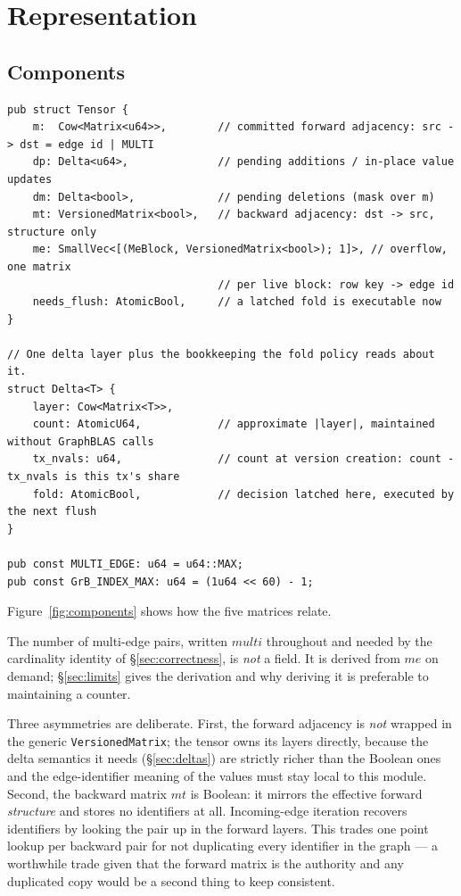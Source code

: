 \documentclass[11pt,a4paper]{article}
\theoremstyle{plain}
\theoremstyle{definition}
\theoremstyle{remark}
\begin{document}
\section{Representation}
\label{sec:representation}

\subsection{Components}
\label{sec:components}

\begin{lstlisting}
pub struct Tensor {
    m:  Cow<Matrix<u64>>,        // committed forward adjacency: src -> dst = edge id | MULTI
    dp: Delta<u64>,              // pending additions / in-place value updates
    dm: Delta<bool>,             // pending deletions (mask over m)
    mt: VersionedMatrix<bool>,   // backward adjacency: dst -> src, structure only
    me: SmallVec<[(MeBlock, VersionedMatrix<bool>); 1]>, // overflow, one matrix
                                 // per live block: row key -> edge id
    needs_flush: AtomicBool,     // a latched fold is executable now
}

// One delta layer plus the bookkeeping the fold policy reads about it.
struct Delta<T> {
    layer: Cow<Matrix<T>>,
    count: AtomicU64,            // approximate |layer|, maintained without GraphBLAS calls
    tx_nvals: u64,               // count at version creation: count - tx_nvals is this tx's share
    fold: AtomicBool,            // decision latched here, executed by the next flush
}

pub const MULTI_EDGE: u64 = u64::MAX;
pub const GrB_INDEX_MAX: u64 = (1u64 << 60) - 1;
\end{lstlisting}

Figure~\ref{fig:components} shows how the five matrices relate.

The number of multi-edge pairs, written $\textit{multi}$ throughout and needed
by the cardinality identity of \S\ref{sec:correctness}, is \emph{not} a field.
It is derived from $me$ on demand; \S\ref{sec:limits} gives the derivation and
why deriving it is preferable to maintaining a counter.

Three asymmetries are deliberate. First, the forward adjacency is \emph{not}
wrapped in the generic \texttt{VersionedMatrix}; the tensor owns its layers
directly, because the delta semantics it needs (\S\ref{sec:deltas}) are
strictly richer than the Boolean ones and the edge-identifier meaning of the
values must stay local to this module. Second, the backward matrix
$mt$ is Boolean: it mirrors the effective forward \emph{structure} and stores
no identifiers at all. Incoming-edge iteration recovers identifiers by
looking the pair up in the forward layers. This trades one point lookup per
backward pair for not duplicating every identifier in the graph --- a
worthwhile trade given that the forward matrix is the authority and any
duplicated copy would be a second thing to keep consistent.
\end{document}
